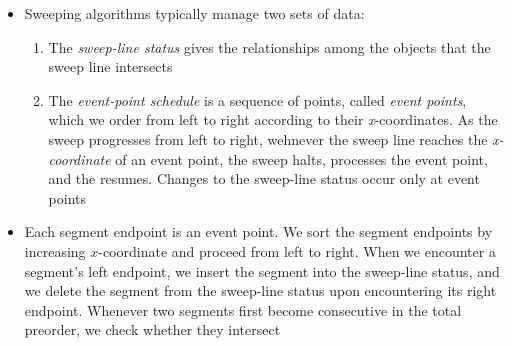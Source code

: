 \documentclass{report}
\begin{document}
\begin{itemize}
    \item Sweeping algorithms typically manage two sets of data:
    \begin{enumerate}
        \item The \textit{sweep-line status} gives the relationships among the objects that the sweep line intersects
        \item The \textit{event-point schedule} is a sequence of points, called \textit{event points}, which we order from left to right according to their \textit{x}-coordinates. As the sweep progresses from left to right, wehnever the sweep line reaches the \textit{x-coordinate} of an event point, the sweep halts, processes the event point, and the resumes. Changes to the sweep-line status occur only at event points
    \end{enumerate}
    \item Each segment endpoint is an event point. We sort the segment endpoints by increasing $x$-coordinate and proceed from left to right. When we encounter a segment's left endpoint, we insert the segment into the sweep-line status, and we delete the segment from the sweep-line status upon encountering its right endpoint. Whenever two segments first become consecutive in the total preorder, we check whether they intersect
\end{itemize}
\end{document}
